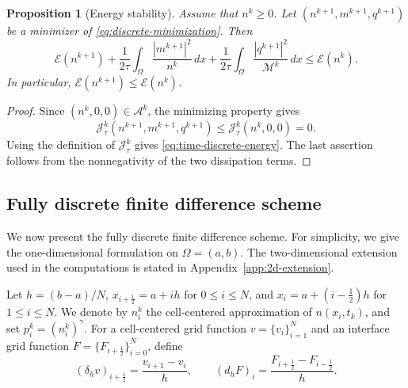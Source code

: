 \documentclass[11pt]{article}
\theoremstyle{plain}
\numberwithin{equation}{section}
\newtheorem{proposition}{Proposition}[section]
\begin{document}
\begin{proposition}[Energy stability]
\label{prop:time-discrete-energy}
Assume that \(n^k\ge0\). Let
\((n^{k+1},m^{k+1},q^{k+1})\) be a minimizer of
\eqref{eq:discrete-minimization}. Then
\begin{equation}\label{eq:time-discrete-energy}
\mathcal E(n^{k+1})
+
\frac{1}{2\tau}
\int_\Omega
\frac{|m^{k+1}|^2}{n^k}\,dx
+
\frac{1}{2\tau}
\int_\Omega
\frac{|q^{k+1}|^2}{\mathcal M^k}\,dx
\le
\mathcal E(n^k).
\end{equation}
In particular, \(\mathcal E(n^{k+1})\le\mathcal E(n^k)\).
\end{proposition}

\begin{proof}
Since \((n^k,0,0)\in\mathcal A^k\), the minimizing property gives
\[
\mathcal J_\tau^k(n^{k+1},m^{k+1},q^{k+1})
\le
\mathcal J_\tau^k(n^k,0,0)
=
0.
\]
Using the definition of \(\mathcal J_\tau^k\) gives
\eqref{eq:time-discrete-energy}. The last assertion follows from the
nonnegativity of the two dissipation terms.
\end{proof}



\subsection{Fully discrete finite difference scheme}
\label{subsec:fully-discrete}
\label{sec:fully-discrete}


We now present the fully discrete finite difference scheme. For simplicity,
we give the one-dimensional formulation on \(\Omega=(a,b)\).
The two-dimensional extension used in the computations is stated in
Appendix~\ref{app:2d-extension}.

Let \(h=(b-a)/N\), \(x_{i+\frac12}=a+ih\) for \(0\le i\le N\), and
\(x_i=a+(i-\frac12)h\) for \(1\le i\le N\). We denote by \(n_i^k\) the
cell-centered approximation of \(n(x_i,t_k)\), and set
\(
    p_i^k=(n_i^k)^\gamma .
\)
For a cell-centered grid function \(v=\{v_i\}_{i=1}^N\) and an interface
grid function \(F=\{F_{i+\frac12}\}_{i=0}^N\), define
\begin{equation}\label{eq:dv_df}
    (\delta_h v)_{i+\frac12}
    =
    \frac{v_{i+1}-v_i}{h},
    \qquad
    (d_hF)_i
    =
    \frac{F_{i+\frac12}-F_{i-\frac12}}{h}.
\end{equation}
\end{document}
